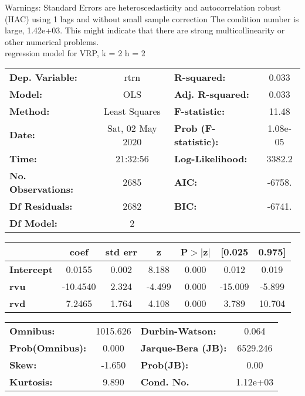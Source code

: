 Warnings: \newline
 [1] Standard Errors are heteroscedasticity and autocorrelation robust (HAC) using 1 lags and without small sample correction \newline
 [2] The condition number is large, 1.42e+03. This might indicate that there are \newline
 strong multicollinearity or other numerical problems.\\ 

regression model for VRP, k = 2 h = 2\begin{center}
\begin{tabular}{lclc}
\toprule
\textbf{Dep. Variable:}    &       rtrn       & \textbf{  R-squared:         } &     0.033   \\
\textbf{Model:}            &       OLS        & \textbf{  Adj. R-squared:    } &     0.033   \\
\textbf{Method:}           &  Least Squares   & \textbf{  F-statistic:       } &     11.48   \\
\textbf{Date:}             & Sat, 02 May 2020 & \textbf{  Prob (F-statistic):} &  1.08e-05   \\
\textbf{Time:}             &     21:32:56     & \textbf{  Log-Likelihood:    } &    3382.2   \\
\textbf{No. Observations:} &        2685      & \textbf{  AIC:               } &    -6758.   \\
\textbf{Df Residuals:}     &        2682      & \textbf{  BIC:               } &    -6741.   \\
\textbf{Df Model:}         &           2      & \textbf{                     } &             \\
\bottomrule
\end{tabular}
\begin{tabular}{lcccccc}
                   & \textbf{coef} & \textbf{std err} & \textbf{z} & \textbf{P$> |$z$|$} & \textbf{[0.025} & \textbf{0.975]}  \\
\midrule
\textbf{Intercept} &       0.0155  &        0.002     &     8.188  &         0.000        &        0.012    &        0.019     \\
\textbf{rvu}       &     -10.4540  &        2.324     &    -4.499  &         0.000        &      -15.009    &       -5.899     \\
\textbf{rvd}       &       7.2465  &        1.764     &     4.108  &         0.000        &        3.789    &       10.704     \\
\bottomrule
\end{tabular}
\begin{tabular}{lclc}
\textbf{Omnibus:}       & 1015.626 & \textbf{  Durbin-Watson:     } &    0.064  \\
\textbf{Prob(Omnibus):} &   0.000  & \textbf{  Jarque-Bera (JB):  } & 6529.246  \\
\textbf{Skew:}          &  -1.650  & \textbf{  Prob(JB):          } &     0.00  \\
\textbf{Kurtosis:}      &   9.890  & \textbf{  Cond. No.          } & 1.12e+03  \\
\bottomrule
\end{tabular}
\end{center}

